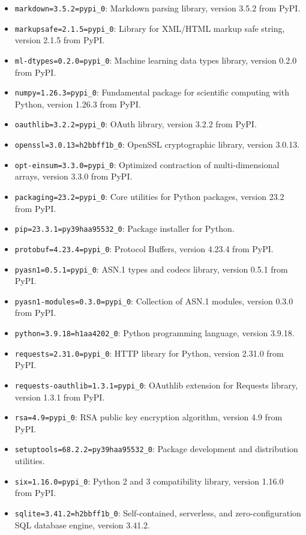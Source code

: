 \begin{itemize}
	\item \texttt{markdown=3.5.2=pypi\_0}: Markdown parsing library, version 3.5.2 from PyPI.
	\item \texttt{markupsafe=2.1.5=pypi\_0}: Library for XML/HTML markup safe string, version 2.1.5 from PyPI.
	\item \texttt{ml-dtypes=0.2.0=pypi\_0}: Machine learning data types library, version 0.2.0 from PyPI.
	\item \texttt{numpy=1.26.3=pypi\_0}: Fundamental package for scientific computing with Python, version 1.26.3 from PyPI.
	\item \texttt{oauthlib=3.2.2=pypi\_0}: OAuth library, version 3.2.2 from PyPI.
	\item \texttt{openssl=3.0.13=h2bbff1b\_0}: OpenSSL cryptographic library, version 3.0.13.
	\item \texttt{opt-einsum=3.3.0=pypi\_0}: Optimized contraction of multi-dimensional arrays, version 3.3.0 from PyPI.
	\item \texttt{packaging=23.2=pypi\_0}: Core utilities for Python packages, version 23.2 from PyPI.
	\item \texttt{pip=23.3.1=py39haa95532\_0}: Package installer for Python.
	\item \texttt{protobuf=4.23.4=pypi\_0}: Protocol Buffers, version 4.23.4 from PyPI.
	\item \texttt{pyasn1=0.5.1=pypi\_0}: ASN.1 types and codecs library, version 0.5.1 from PyPI.
	\item \texttt{pyasn1-modules=0.3.0=pypi\_0}: Collection of ASN.1 modules, version 0.3.0 from PyPI.
	\item \texttt{python=3.9.18=h1aa4202\_0}: Python programming language, version 3.9.18.
	\item \texttt{requests=2.31.0=pypi\_0}: HTTP library for Python, version 2.31.0 from PyPI.
	\item \texttt{requests-oauthlib=1.3.1=pypi\_0}: OAuthlib extension for Requests library, version 1.3.1 from PyPI.
	\item \texttt{rsa=4.9=pypi\_0}: RSA public key encryption algorithm, version 4.9 from PyPI.
	\item \texttt{setuptools=68.2.2=py39haa95532\_0}: Package development and distribution utilities.
	\item \texttt{six=1.16.0=pypi\_0}: Python 2 and 3 compatibility library, version 1.16.0 from PyPI.
	\item \texttt{sqlite=3.41.2=h2bbff1b\_0}: Self-contained, serverless, and zero-configuration SQL database engine, version 3.41.2.

\end{itemize}
